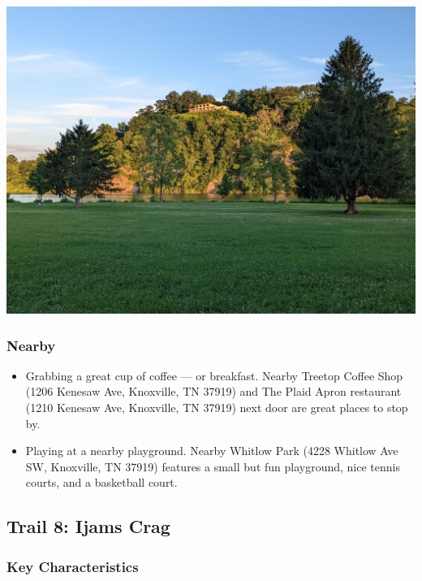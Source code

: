 \documentclass[
  letterpaper,
  DIV=11,
  numbers=noendperiod]{scrartcl}
\providecommand{\tightlist}{%
  \setlength{\itemsep}{0pt}\setlength{\parskip}{0pt}}\usepackage{longtable,booktabs,array}
\begin{document}
\includegraphics{img/trail-07-figure-02.jpg}

\hypertarget{nearby-6}{%
\subsubsection{Nearby}\label{nearby-6}}

\begin{itemize}
\tightlist
\item
  Grabbing a great cup of coffee --- or breakfast. Nearby Treetop Coffee
  Shop (1206 Kenesaw Ave, Knoxville, TN 37919) and The Plaid Apron
  restaurant (1210 Kenesaw Ave, Knoxville, TN 37919) next door are great
  places to stop by.
\item
  Playing at a nearby playground. Nearby Whitlow Park (4228 Whitlow Ave
  SW, Knoxville, TN 37919) features a small but fun playground, nice
  tennis courts, and a basketball court.
\end{itemize}

\hypertarget{trail-8-ijams-crag}{%
\subsection{Trail 8: Ijams Crag}\label{trail-8-ijams-crag}}

\hypertarget{key-characteristics-7}{%
\subsubsection{Key Characteristics}\label{key-characteristics-7}}
\end{document}
